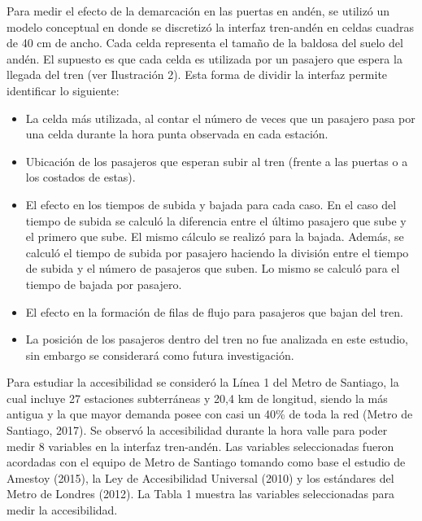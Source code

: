 Para medir el efecto de la demarcación en las puertas en andén, se utilizó un modelo conceptual en donde se discretizó la interfaz tren-andén en celdas cuadras de 40 cm de ancho. Cada celda representa el tamaño de la baldosa del suelo del andén. El supuesto es que cada celda es utilizada por un pasajero que espera la llegada del tren (ver Ilustración 2). Esta forma de dividir la interfaz permite identificar lo siguiente:
\begin{itemize}
  \item La celda más utilizada, al contar el número de veces que un pasajero pasa por una celda durante la hora punta observada en cada estación. 
  \item Ubicación de los pasajeros que esperan subir al tren (frente a las puertas o a los costados de estas).
  \item El efecto en los tiempos de subida y bajada para cada caso. En el caso del tiempo de subida se calculó la diferencia entre el último pasajero que sube y el primero que sube. El mismo cálculo se realizó para la bajada. Además, se calculó el tiempo de subida por pasajero haciendo la división entre el tiempo de subida y el número de pasajeros que suben. Lo mismo se calculó para el tiempo de bajada por pasajero.
  \item El efecto en la formación de filas de flujo para pasajeros que bajan del tren.
  \item La posición de los pasajeros dentro del tren no fue analizada en este estudio, sin embargo se considerará como futura investigación.
\end{itemize}

Para estudiar la accesibilidad se consideró la Línea 1 del Metro de Santiago, la cual incluye 27 estaciones subterráneas y 20,4 km de longitud, siendo la más antigua y la que mayor demanda posee con casi un 40\% de toda la red (Metro de Santiago, 2017). Se observó la accesibilidad durante la hora valle para poder medir 8 variables en la interfaz tren-andén. Las variables seleccionadas fueron acordadas con el equipo de Metro de Santiago tomando como base el estudio de Amestoy (2015), la Ley de Accesibilidad Universal (2010) y los estándares del Metro de Londres (2012). La Tabla 1 muestra las variables seleccionadas para medir la accesibilidad.

